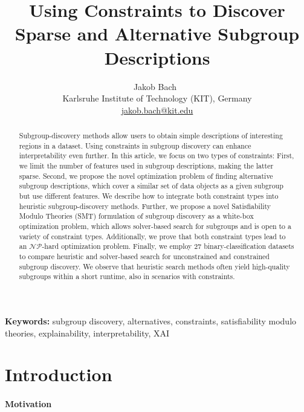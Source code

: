 \documentclass{article}
\title{
	Using Constraints to Discover Sparse and Alternative Subgroup Descriptions
}
\author{
	Jakob Bach~\orcidlink{0000-0003-0301-2798}\\
	\small Karlsruhe Institute of Technology (KIT), Germany\\
	\small \href{mailto:jakob.bach@kit.edu}{jakob.bach@kit.edu}
}
\date{} %
\theoremstyle{definition}
\begin{document}
\maketitle

\begin{abstract}
Subgroup-discovery methods allow users to obtain simple descriptions of interesting regions in a dataset.
Using constraints in subgroup discovery can enhance interpretability even further.
In this article, we focus on two types of constraints:
First, we limit the number of features used in subgroup descriptions, making the latter sparse.
Second, we propose the novel optimization problem of finding alternative subgroup descriptions, which cover a similar set of data objects as a given subgroup but use different features.
We describe how to integrate both constraint types into heuristic subgroup-discovery methods.
Further, we propose a novel Satisfiability Modulo Theories (SMT) formulation of subgroup discovery as a white-box optimization problem, which allows solver-based search for subgroups and is open to a variety of constraint types.
Additionally, we prove that both constraint types lead to an $\mathcal{NP}$-hard optimization problem.
Finally, we employ 27 binary-classification datasets to compare heuristic and solver-based search for unconstrained and constrained subgroup discovery.
We observe that heuristic search methods often yield high-quality subgroups within a short runtime, also in scenarios with constraints.
\end{abstract}
%
\textbf{Keywords:} subgroup discovery, alternatives, constraints, satisfiability modulo theories, explainability, interpretability, XAI

\section{Introduction}
\label{sec:csd:introduction}

\paragraph{Motivation}
\end{document}
